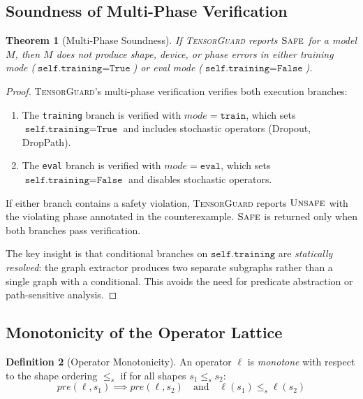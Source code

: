 \documentclass[10pt]{article}
\newcommand{\tguard}{\textsc{TensorGuard}}
\theoremstyle{plain}
\newtheorem{theorem}{Theorem}[section]
\theoremstyle{definition}
\newtheorem{definition}[theorem]{Definition}
\theoremstyle{remark}
\begin{document}
\subsection{Soundness of Multi-Phase Verification}

\begin{theorem}[Multi-Phase Soundness]\label{thm:multiphase-sound}
If \tguard{} reports $\textsc{Safe}$ for a model $M$, then $M$
does not produce shape, device, or phase errors in either training
mode ($\texttt{self.training} = \texttt{True}$) or eval mode
($\texttt{self.training} = \texttt{False}$).
\end{theorem}

\begin{proof}
\tguard{}'s multi-phase verification verifies both execution
branches:
\begin{enumerate}[nosep]
  \item The \texttt{training} branch is verified with
    $\mathit{mode} = \texttt{train}$, which sets
    $\texttt{self.training} = \texttt{True}$ and includes
    stochastic operators (Dropout, DropPath).
  \item The \texttt{eval} branch is verified with
    $\mathit{mode} = \texttt{eval}$, which sets
    $\texttt{self.training} = \texttt{False}$ and disables
    stochastic operators.
\end{enumerate}
If either branch contains a safety violation, \tguard{} reports
$\textsc{Unsafe}$ with the violating phase annotated in the
counterexample.  $\textsc{Safe}$ is returned only when both
branches pass verification.

The key insight is that conditional branches on
$\texttt{self.training}$ are \emph{statically resolved}: the
graph extractor produces two separate subgraphs rather than a
single graph with a conditional.  This avoids the need for
predicate abstraction or path-sensitive analysis.
\end{proof}

\subsection{Monotonicity of the Operator Lattice}

\begin{definition}[Operator Monotonicity]
An operator $\ell$ is \emph{monotone} with respect to the shape
ordering $\leq_s$ if for all shapes $s_1 \leq_s s_2$:
\[
  \mathit{pre}(\ell, s_1) \implies \mathit{pre}(\ell, s_2)
  \quad\text{and}\quad
  \ell(s_1) \leq_s \ell(s_2)
\]
\end{definition}
\end{document}
